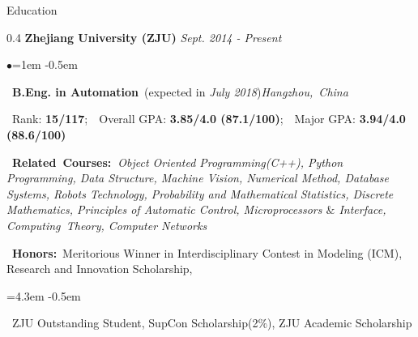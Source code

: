 \documentclass{resume} %
\begin{document}

\begin{rSection}{Education}

\begin{spacing}{0.4}
{\bf \Large{Zhejiang University (ZJU)}} \hfill {\em Sept. 2014 - Present}\smallskip\\
\end{spacing}
\begin{list}{$\bullet$}{\leftmargin=1em} %
   \itemsep -0.5em \vspace{-0.5em} %
\item ~{\bf B.Eng. in Automation}~(expected in {\em July 2018})\hfill{\em Hangzhou,~China}
\item ~{Rank:} {\bf15/117};~~{Overall GPA: }{\bf3.85/4.0 (87.1/100)};~~{Major GPA: }{\bf3.94/4.0 (88.6/100)}
\item ~{\bf Related~Courses:~}{\em Object Oriented Programming(C++), Python Programming, Data Structure, Machine Vision, Numerical Method, Database Systems, Robots Technology, Probability and Mathematical Statistics, Discrete Mathematics, Principles of Automatic Control, Microprocessors $\&$ Interface, Computing~Theory, Computer Networks}
\item ~{\bfseries Honors:}~{Meritorious Winner in Interdisciplinary Contest in Modeling (ICM), Research and Innovation Scholarship,}
	\begin{list}{}{\leftmargin=4.3em}
	\itemsep -0.5em \vspace{-0.5em}
	\item ~{ZJU Outstanding Student, SupCon Scholarship(2$\%$), ZJU Academic Scholarship}
	\end{list}
	\end{list}


\end{rSection}
\end{document}
